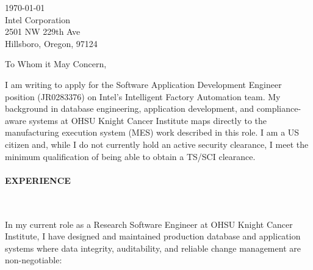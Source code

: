 



\textcolor{my-grey}{\dotfill}
\bigbreak

{\today}\\
Intel Corporation\\
2501 NW 229th Ave\\
Hillsboro, Oregon, 97124

\vspace*{2\baselineskip}

To Whom it May Concern,

\vspace*{\baselineskip}

I am writing to apply for the Software Application Development Engineer position (JR0283376) on Intel's Intelligent Factory Automation team. My background in database engineering, application development, and compliance-aware systems at OHSU Knight Cancer Institute maps directly to the manufacturing execution system (MES) work described in this role. I am a US citizen and, while I do not currently hold an active security clearance, I meet the minimum qualification of being able to obtain a TS/SCI clearance.

\paragraph{EXPERIENCE}\

\vspace*{\baselineskip}

In my current role as a Research Software Engineer at OHSU Knight Cancer Institute, I have designed and maintained production database and application systems where data integrity, auditability, and reliable change management are non-negotiable:

